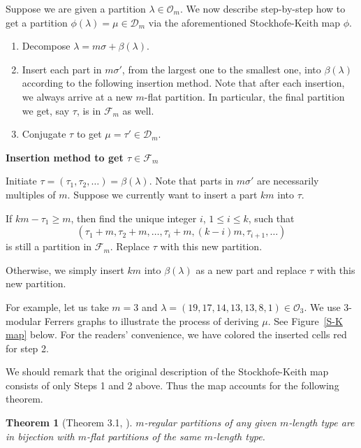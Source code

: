 \documentclass[11pt,reqno]{amsart}
\numberwithin{equation}{section}
\theoremstyle{plain}
\newtheorem{theorem}{Theorem}[section]
\theoremstyle{definition}
\newcommand{\F}{\mathcal{F}}
\newcommand{\D}{\mathcal{D}}
\newcommand{\OO}{\mathcal{O}}
\begin{document}
Suppose we are given a partition $\lambda\in\OO_m$. We now describe step-by-step how to get a partition $\phi(\lambda)=\mu\in\D_m$ via the aforementioned Stockhofe-Keith map $\phi$.
\begin{enumerate}
	\item[Step 1:]  Decompose $\lambda=m\sigma+\beta(\lambda)$.
	\item[Step 2:] Insert each part in $m\sigma'$, from the largest one to the smallest one, into $\beta(\lambda)$ according to the following insertion method. Note that after each insertion, we always arrive at a new $m$-flat partition. In particular, the final partition we get, say $\tau$, is in $\F_m$ as well.
	\item[Step 3:] Conjugate $\tau$ to get $\mu=\tau'\in\D_m$.
\end{enumerate}

\begin{framed}
\begin{center}
 {\bf Insertion method to get $\tau\in\F_m$}
\end{center}
\noindent Initiate $\tau=(\tau_1,\tau_2,\ldots)=\beta(\lambda)$. Note that parts in $m\sigma'$ are necessarily multiples of $m$. Suppose we currently want to insert a part $km$ into $\tau$.

If $km-\tau_1\ge m$, then find the unique integer $i$, $1\le i\le k$, such that $$(\tau_1+m,\tau_2+m,\ldots,\tau_i+m, (k-i)m, \tau_{i+1},\ldots)$$ is still a partition in $\F_m$. Replace $\tau$ with this new partition.

Otherwise, we simply insert $km$ into $\beta(\lambda)$ as a new part and replace $\tau$ with this new partition.
\end{framed}

For example, let us take $m=3$ and $\lambda=(19,17,14,13,13,8,1)\in\OO_3$. We use $3$-modular Ferrers graphs \cite{Andr1976} to illustrate the process of deriving $\mu$. See Figure~\ref{S-K map} below. For the readers' convenience, we have colored the inserted cells red for step 2.

We should remark that the original description of the Stockhofe-Keith map \cite{Kei-the, Sto} consists of only Steps 1 and 2 above. Thus the  map \cite{Kei-the, Sto} accounts for the following theorem.

\begin{theorem}[Theorem 3.1, \cite{KX}]  \label{KXtheorem}
$m$-regular partitions of any given $m$-length type are in bijection with $m$-flat partitions of the same $m$-length type.
\end{theorem}
\end{document}
